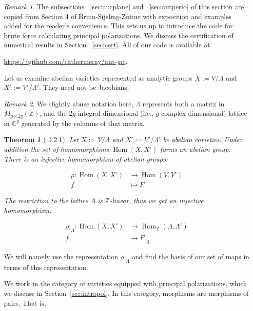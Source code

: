 \documentclass[12pt,reqno]{amsart}
\DeclareMathOperator{\Hom}{Hom}
\newcommand{\C}{\mathbb{C}}
\newcommand{\Z}{\mathbb{Z}}
\newtheorem*{thm*}{Theorem}
\theoremstyle{definition}
\theoremstyle{remark}
\newtheorem*{remark}{Remark}
\begin{document}
\label{sec:computing}

\begin{remark} The subsections ~\ref{sec:autplane} and ~\ref{sec:autperio} of this section are copied from Section 4 of Bruin-Sijsling-Zotine \cite{numerical} with exposition and examples added for the reader's convenience. This sets us up to introduce the code for brute force calculating principal polarizations. We discuss the certification of numerical results in Section ~\ref{sec:cert}. All of our code is available at \begin{center}\url{https://github.com/catherineray/aut-jac}.\end{center}  \end{remark} 

Let us examine abelian varieties represented as analytic groups $X := V/\Lambda$ and $X' := V'/\Lambda'$. They need not be Jacobians.

\begin{remark} We slightly abuse notation here, $\Lambda$ represents both a matrix in $M_{g \times 2g}(\Z)$, and the $2g$-integral-dimensional (i.e., $g$-complex-dimensional) lattice in $\C^g$ generated by the columns of that matrix.\end{remark}
 

\begin{thm*}[\cite{bl} 1.2.1] Let $X:= V/\Lambda$ and $X':= V'/\Lambda'$ be abelian varieties. Under addition the set of homomorphisms $\Hom(X, X')$ forms an abelian group. There is an injective homomorphism of abelian groups: 


\begin{align*} 
\rho: \Hom(X, X') &\to \Hom(V, V') \\
f &\mapsto F
\end{align*} 

The restriction to the lattice $\Lambda$ is $\Z$-linear, thus we get an injective homomorphism: 


\begin{align*} 
\rho|_{\Lambda}: \Hom(X, X') &\to \Hom_{\Z}(\Lambda, \Lambda') \\
f &\mapsto F|_{\Lambda}
\end{align*} 


\end{thm*}


We will namely use the representation $\rho|_{\Lambda}$ and find the basis of our set of maps in terms of this representation. 

We work in the category of varieties equipped with principal polarizations, which we discuss in Section~\ref{sec:intropol}. In this category, morphisms are morphisms of pairs. That is,
\end{document}
